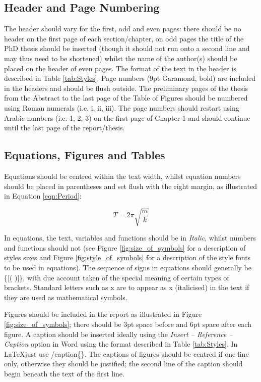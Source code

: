 \subsection{Header and Page Numbering}
The header should vary for the first, odd and even pages: there should be no header on the first page of each section/chapter, on odd pages the title of the PhD thesis should be inserted (though it should not run onto a second line and may thus need to be shortened) whilst the name of the author(s) should be placed on the header of even pages.  The format of the text in the header is described in Table \ref{tab:Styles}. Page numbers (9pt Garamond, bold) are included in the headers and should be flush outside. The preliminary pages of the thesis from the Abstract to the last page of the Table of Figures should be numbered using Roman numerals (i.e. i, ii, iii).  The page numbers should restart using Arabic numbers (i.e. 1, 2, 3) on the first page of Chapter 1 and should continue until the last page of the report/thesis.

\subsection{Equations, Figures and Tables}
Equations should be centred within the text width, whilst equation numbers should be placed in parentheses and set flush with the right margin, as illustrated in Equation \eqref{eqn:Period}:

\begin{equation}
    \label{eqn:Period}
    T=2\pi\sqrt{\frac{m}{k}}
\end{equation}

In equations, the text, variables and functions should be in \textit{Italic}, whilst numbers and functions should not (see Figure \ref{fig:size_of_symbols} for a description of styles sizes and Figure \ref{fig:style_of_symbols} for a description of the style fonts to be used in equations). The sequence of signs in equations should generally be \{[(  )]\}, with due account taken of the special meaning of certain types of brackets. Standard letters such as x are to appear as x (italicised) in the text if they are used as mathematical symbols.\par
Figures should be included in the report as illustrated in Figure \ref{fig:size_of_symbols}; there should be 3pt space before and 6pt space after each figure. A caption should be inserted ideally using the \textit{Insert – Reference – Caption} option in Word using the format described in Table \ref{tab:Styles}. In \LaTeX \space just use \slash{caption\{\}}. The captions of figures should be centred if one line only, otherwise they should be justified; the second line of the caption should begin beneath the text of the first line. 

